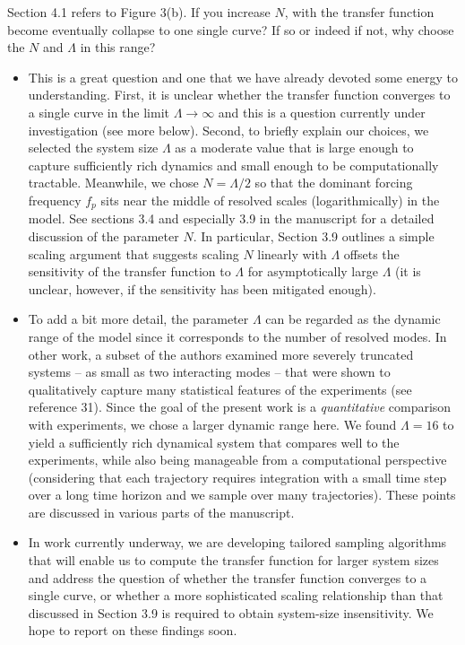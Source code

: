 \documentclass[11pt]{article}
\newcommand{\comment}[1]{{\color{blue} #1}}
\begin{document}
\noindent
\comment{Section 4.1 refers to Figure 3(b). If you increase $N$, with the transfer function become eventually collapse to one single curve? If so or indeed if not, why choose the $N$ and $\Lambda$ in this range?}

\begin{itemize}
\item This is a great question and one that we have already devoted some energy to understanding. First, it is unclear whether the transfer function converges to a single curve in the limit $\Lambda \to \infty$ and this is a question currently under investigation (see more below). Second, to briefly explain our choices, we selected the system size $\Lambda$ as a moderate value that is large enough to capture sufficiently rich dynamics and small enough to be computationally tractable. Meanwhile, we chose $N = \Lambda / 2$ so that the dominant forcing frequency $f_p$ sits near the middle of resolved scales (logarithmically) in the model. See sections 3.4 and especially 3.9 in the manuscript for a detailed discussion of the parameter $N$. In particular, Section 3.9 outlines a simple scaling argument that suggests scaling $N$ linearly with $\Lambda$ offsets the sensitivity of the transfer function to $\Lambda$ for asymptotically large $\Lambda$ (it is unclear, however, if the sensitivity has been mitigated enough).

\item To add a bit more detail, the parameter $\Lambda$ can be regarded as the dynamic range of the model since it corresponds to the number of resolved modes. In other work, a subset of the authors examined more severely truncated systems -- as small as two interacting modes -- that were shown to qualitatively capture many statistical features of the experiments (see reference 31). Since the goal of the present work is a {\em quantitative} comparison with experiments, we chose a larger dynamic range here. We found $\Lambda = 16$ to yield a sufficiently rich dynamical system that compares well to the experiments, while also being manageable from a computational perspective (considering that each trajectory requires integration with a small time step over a long time horizon and we sample over many trajectories). These points are discussed in various parts of the manuscript.
	
\item In  work currently underway, we are developing tailored sampling algorithms that will enable us to compute the transfer function for larger system sizes and address the question of whether the transfer function converges to a single curve, or whether a more sophisticated scaling relationship than that discussed in Section 3.9 is required to obtain system-size insensitivity. We hope to report on these findings soon.


\end{itemize}
\end{document}
